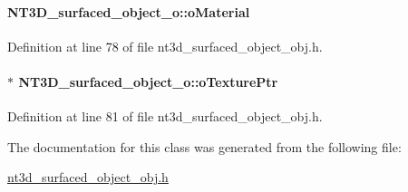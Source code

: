 \paragraph[{oMaterial}]{ {\bf NT3D\_\-surfaced\_\-object\_\-o::oMaterial}}\hfill\label{class_n_t3_d__surfaced__object__o_a48c223ebdc47fee300835b626adeee22}


Definition at line 78 of file nt3d\_\-surfaced\_\-object\_\-obj.h.

\paragraph[{oTexturePtr}]{$\ast$ {\bf NT3D\_\-surfaced\_\-object\_\-o::oTexturePtr}}\hfill\label{class_n_t3_d__surfaced__object__o_adbdb2a7cc584844721c1bfc7b8acb3be}


Definition at line 81 of file nt3d\_\-surfaced\_\-object\_\-obj.h.



The documentation for this class was generated from the following file:\begin{DoxyCompactItemize}
\item 
\hyperlink{nt3d__surfaced__object__obj_8h}{nt3d\_\-surfaced\_\-object\_\-obj.h}\end{DoxyCompactItemize}
